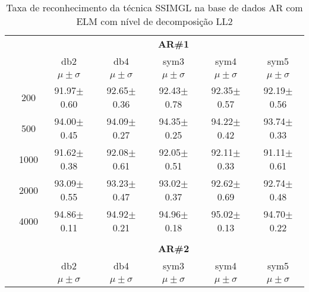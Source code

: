 \begin{table}[H]
\begin{tabular}{|c|c|c c c c c|}
\\\midrule
 \end{tabular}
\end{table}





\begin{table}[H]
	\centering
    \normalsize
	\caption{Taxa de reconhecimento da técnica SSIMGL na base de dados AR com ELM com nível de decomposição LL2}
		\begin{tabular}{|c|c|c c c c c|}
\cline{3-7}
\multicolumn{2}{c|}{\multirow{3}{*}{}} & \multicolumn{5}{c|}{\textbf{AR\#1}}   \\\cline{3-7} 
\multicolumn{2}{c|}{}  & db2 & db4 & sym3 & sym4 & sym5 \\\cline{3-7}%
\multicolumn{2}{c|}{}& $\mu \pm \sigma$ & $\mu \pm \sigma$ & $\mu \pm \sigma$ & $\mu \pm \sigma$ & $\mu \pm \sigma$ \\\hline


\multicolumn{1}{|c|}{ \multirow{5}{*}{\rotatebox[origin=c]{90}{\textbf{Neurônios}}} }
&200	&91.97$\pm$0.60	&92.65$\pm$0.36	&92.43$\pm$0.78	&92.35$\pm$0.57	&92.19$\pm$0.56\\\cline{2-7}
&500	&94.00$\pm$0.45	&94.09$\pm$0.27	&94.35$\pm$0.25	&94.22$\pm$0.42	&93.74$\pm$0.33\\\cline{2-7}
&1000	&91.62$\pm$0.38	&92.08$\pm$0.61	&92.05$\pm$0.51	&92.11$\pm$0.33	&91.11$\pm$0.61\\\cline{2-7}
&2000	&93.09$\pm$0.55	&93.23$\pm$0.47	&93.02$\pm$0.37	&92.62$\pm$0.69	&92.74$\pm$0.48\\\cline{2-7}
&4000	&94.86$\pm$0.11	&94.92$\pm$0.21	&94.96$\pm$0.18	&95.02$\pm$0.13	&94.70$\pm$0.22
    

\\ \midrule
\multicolumn{7}{c}{}\\ 


\cline{3-7}
\multicolumn{2}{c|}{\multirow{3}{*}{}} & \multicolumn{5}{c|}{\textbf{AR\#2}}   \\\cline{3-7} 
\multicolumn{2}{c|}{}  & db2 & db4 & sym3 & sym4 & sym5 \\\cline{3-7}%
\multicolumn{2}{c|}{}& $\mu \pm \sigma$ & $\mu \pm \sigma$ & $\mu \pm \sigma$ & $\mu \pm \sigma$ & $\mu \pm \sigma$ \\\hline


\end{tabular}
\end{table}
